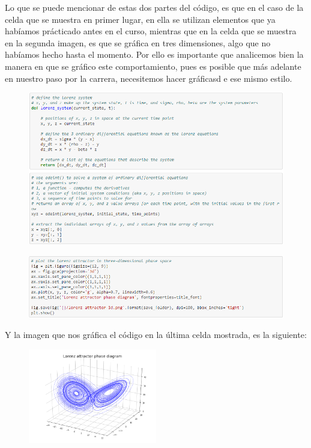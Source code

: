 \documentclass{article}
\begin{document}
Lo que se puede mencionar de estas dos partes del código, es que en el caso de la celda que se muestra en primer lugar, en ella se utilizan elementos que ya habíamos prácticado antes en el curso, mientras que en la celda que se muestra en la segunda imagen, es que se gráfica en tres dimensiones, algo que no habíamos hecho hasta el momento.
Por ello es importante que analicemos bien la manera en que se gráfico este comportamiento, pues es posible que más adelante en nuestro paso por la carrera, necesitemos hacer gráficasd e ese mismo estilo.
\begin{figure}[H]
    \includegraphics[width=1\textwidth]{Celda3.PNG}
    \centering
    \label{Cod}
\end{figure}
\begin{figure}[H]
    \includegraphics[width=1\textwidth]{Celda4.PNG}
    \centering
    \label{Cod}
\end{figure}
Y la imagen que nos gráfica el código en la última celda mostrada, es la siguiente:
\begin{figure}[H]
    \includegraphics[width=0.5\textwidth]{Visualizacion1.png}
    \centering
    \label{Graf}
\end{figure}
\end{document}
